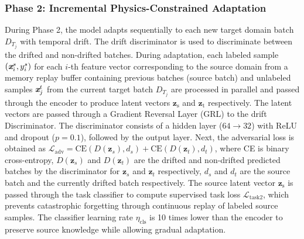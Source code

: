 \documentclass{IEEE_lsens}
\begin{document}
\subsubsection*{Phase 2: Incremental Physics-Constrained Adaptation}
During Phase 2, the model adapts sequentially to each new target domain batch $D_{T_j}$ with temporal drift.
The drift discriminator is used to discriminate between the drifted and non-drifted batches.
During adaptation, each labeled sample $(\textit{\textbf{x}}_i^s, y_i^s)$ for each $i$-th feature vector corresponding to the source domain from a memory replay buffer containing previous batches (source batch) and unlabeled samples $\textit{\textbf{x}}_j^t$ from the current target batch $D_{T_j}$ are processed in parallel and passed through the encoder to produce latent vectors $\textbf{z}_\text{s}$ and $\textbf{z}_\text{t}$ respectively.
The latent vectors are passed through a Gradient Reversal Layer (GRL) to the drift  Discriminator. %
The discriminator consists of a hidden layer ($64 \rightarrow 32$) with ReLU and dropout ($p=0.1$), followed by the output layer. Next, the adversarial loss is obtained as $\mathcal{L}_{\text{adv}} = \text{CE}(D(\textbf{z}_s), d_s) + \text{CE}(D(\textbf{z}_t), d_t)$, where CE is binary cross-entropy, $D(\textbf{z}_s)$ and $D(\textbf{z}_t)$ are the drifted and non-drifted predicted batches by the discriminator for $\textbf{z}_s$ and $\textbf{z}_t$ respectively, $d_s$ and $d_t$ are the source batch and the currently drifted batch respectively. %
The source latent vector $\textbf{z}_\text{s}$ is passed through the task classifier to compute supervised task loss $\mathcal{L}_{\text{task2}}$, which prevents catastrophic forgetting through continuous replay of labeled source samples\cite{lee2024incremental}. The classifier learning rate $\eta_\text{cls}$ is 10 times lower than the encoder to preserve source knowledge while allowing gradual adaptation.
\end{document}
